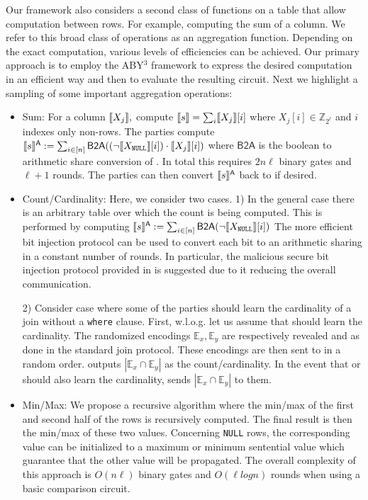 Our framework also considers a second class of functions on a table that allow computation between rows. For example, computing the sum of a column. We refer to this broad class of operations as an aggregation function. Depending on the exact computation, various levels of efficiencies can be achieved. Our primary approach is to employ the ABY$^3$ framework \cite{aby3} to express the desired computation in an efficient way and then to evaluate the resulting circuit. Next we highlight a sampling of some important aggregation operations:
\begin{itemize}
	\item Sum: For a column $\llbracket X_j\rrbracket,$ compute $\llbracket s\rrbracket=\sum_i \llbracket X_j\rrbracket[i]$ where $X_j[i]\in \mathbb{Z}_{2^\ell}$ and $i$ indexes only non-\Null rows. The parties compute $\llbracket s\rrbracket^{\textsf{A}}:=\sum_{i\in [n]}\textsf{B2A}((\neg\llbracket X_\texttt{NULL}\rrbracket[i]) \cdot \llbracket X_j\rrbracket[i])$ where $\textsf{B2A}$ is the boolean to arithmetic share conversion of \cite{aby3}. In total this requires $2n\ell$ binary gates and $\ell+1$ rounds\cite{aby3}. The parties can then convert $\llbracket s\rrbracket^{\textsf{A}}$ back to  if desired. %
	
	\item Count/Cardinality: Here, we consider two cases. 1) In the general case there is an arbitrary table over which the count is being computed. This is performed by computing $\llbracket s\rrbracket^{\textsf{A}}:=\sum_{i\in [n]}\textsf{B2A}(\neg\llbracket X_\texttt{NULL}\rrbracket[i])$ 
	\iffullversion 
	The more efficient bit injection protocol\cite{aby3} can be used to convert each bit to an arithmetic sharing in a constant number of rounds. In particular, the malicious secure bit injection protocol provided in \cite{aby3} is suggested due to it reducing the overall communication. 
	\fi
	
	2) Consider case where some of the parties should learn the cardinality of a join without a \texttt{where} clause. %
	First, w.l.o.g. let us assume that  should learn the cardinality. The randomized encodings $\mathbb{E}_x,\mathbb{E}_y$ are respectively revealed  and   as done in the standard join protocol. These encodings are then sent to  in a random order.  outputs $|\mathbb{E}_x \cap \mathbb{E}_y|$ as the count/cardinality. In the event that  or  should also learn the cardinality,  sends $|\mathbb{E}_x \cap \mathbb{E}_y|$ to them.
	
	\item  Min/Max: We propose a recursive algorithm where the min/max of the first and second half of the rows is recursively computed. The final result is then the min/max of these two values.  Concerning \texttt{NULL} rows, the corresponding value can be initialized to a maximum or minimum sentential value which guarantee that the other value will be propagated. The overall complexity of this approach is $O(n\ell)$ binary gates and $O(\ell log n)$ rounds when using a basic comparison circuit\cite{aby3}.
\end{itemize}

